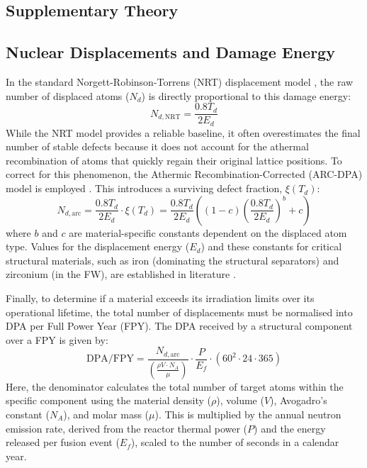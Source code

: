 \documentclass[11pt]{article}
\begin{document}
\newpage
\begin{appendices}




\section{Supplementary Theory}
\label{app:supplementary_theory}
\renewcommand{\thefigure}{A\arabic{figure}}
\setcounter{figure}{0}

\subsection{Nuclear Displacements and Damage Energy}
\label{app:theory_displacements}
In the standard Norgett-Robinson-Torrens (NRT) displacement model \citep{norgett1975proposed}, the
raw number of displaced atoms ($N_d$) is directly proportional to this damage energy:
\begin{equation}
    N_{d,\text{NRT}} = \frac{0.8 T_d}{2 E_d}
    \label{eq:nrt_model}
\end{equation}
While the NRT model provides a reliable baseline, it often overestimates the final number of stable
defects because it does not account for the athermal recombination of atoms that quickly regain
their original lattice positions. To correct for this phenomenon, the Athermic
Recombination-Corrected (ARC-DPA) model is employed \citep{nordlund2018improving}. This introduces a
surviving defect fraction, $\xi(T_d)$:
\begin{equation}
    N_{d,\text{arc}} = \frac{0.8 T_d}{2 E_d} \cdot \xi(T_d) = \frac{0.8 T_d}{2 E_d} \left( (1-c) \left( \frac{0.8 T_d}{2 E_d} \right)^b + c \right)
    \label{eq:arcdpa_model}
\end{equation}
where $b$ and $c$ are material-specific constants dependent on the displaced atom type. Values for
the displacement energy ($E_d$) and these constants for critical structural materials, such as iron
(dominating the structural separators) and zirconium (in the FW), are established in
literature \citep{woods_properties_1966}.

Finally, to determine if a material exceeds its irradiation limits over its operational lifetime,
the total number of displacements must be normalised into DPA per Full Power Year (FPY). The DPA
received by a structural component over a FPY is given by:
\begin{equation}
    \text{DPA/FPY} = \frac{N_{d,\text{arc}}}{\left(\frac{\rho V \cdot N_A}{\mu}\right)} \cdot \frac{P}{E_f} \cdot (60^2 \cdot 24 \cdot 365)
    \label{eq:dpa_fpy}
\end{equation}
Here, the denominator calculates the total number of target atoms within the specific component
using the material density ($\rho$), volume ($V$), Avogadro's constant ($N_A$), and molar mass
($\mu$). This is multiplied by the annual neutron emission rate, derived from the reactor thermal
power ($P$) and the energy released per fusion event ($E_f$), scaled to the number of seconds in a
calendar year.


\end{appendices}
\end{document}
